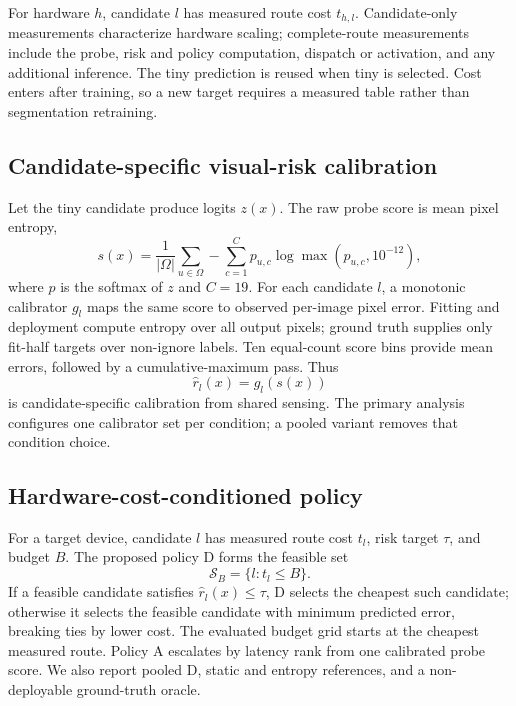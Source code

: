 \documentclass[a4paper,review,12pt]{elsarticle}
\begin{document}
For hardware $h$, candidate $l$ has measured route cost $t_{h,l}$. Candidate-only measurements characterize hardware scaling; complete-route measurements include the probe, risk and policy computation, dispatch or activation, and any additional inference. The tiny prediction is reused when tiny is selected. Cost enters after training, so a new target requires a measured table rather than segmentation retraining.

\subsection{Candidate-specific visual-risk calibration}
\label{sec:calibration}

Let the tiny candidate produce logits $z(x)$. The raw probe score is mean pixel entropy,
\begin{equation}
s(x)=\frac{1}{|\Omega|}\sum_{u\in\Omega}-\sum_{c=1}^{C}p_{u,c}\log\max(p_{u,c},10^{-12}),
\label{eq:entropy}
\end{equation}
where $p$ is the softmax of $z$ and $C=19$. For each candidate $l$, a monotonic calibrator $g_l$ maps the same score to observed per-image pixel error. Fitting and deployment compute entropy over all output pixels; ground truth supplies only fit-half targets over non-ignore labels. Ten equal-count score bins provide mean errors, followed by a cumulative-maximum pass. Thus
\begin{equation}
\widehat{r}_l(x)=g_l(s(x))
\label{eq:risk}
\end{equation}
is candidate-specific calibration from shared sensing. The primary analysis configures one calibrator set per condition; a pooled variant removes that condition choice.

\subsection{Hardware-cost-conditioned policy}
\label{sec:policy}

For a target device, candidate $l$ has measured route cost $t_l$, risk target $\tau$, and budget $B$. The proposed policy D forms the feasible set
\begin{equation}
\mathcal{S}_B=\{l:t_l\leq B\}.
\label{eq:feasible}
\end{equation}
If a feasible candidate satisfies $\widehat{r}_l(x)\leq\tau$, D selects the cheapest such candidate; otherwise it selects the feasible candidate with minimum predicted error, breaking ties by lower cost. The evaluated budget grid starts at the cheapest measured route. Policy A escalates by latency rank from one calibrated probe score. We also report pooled D, static and entropy references, and a non-deployable ground-truth oracle.
\end{document}
